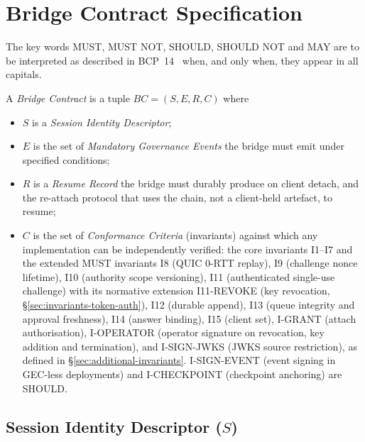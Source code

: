 \section{Bridge Contract Specification}
\label{sec:spec}

The key words MUST, MUST NOT, SHOULD, SHOULD NOT and MAY are to be
interpreted as described in BCP~14~\cite{bradner1997key,leiba2017rfc} when,
and only when, they appear in all capitals.

\begin{definition}\label{def:bc}
A \emph{Bridge Contract} is a tuple $BC = (S, E, R, C)$ where
\begin{itemize}[leftmargin=2em]
\item $S$ is a \emph{Session Identity Descriptor};
\item $E$ is the set of \emph{Mandatory Governance Events} the bridge
must emit under specified conditions;
\item $R$ is a \emph{Resume Record} the bridge must durably produce
on client detach, and the re-attach protocol that uses the chain, not a
client-held artefact, to resume;
\item $C$ is the set of \emph{Conformance Criteria} (invariants) against
which any implementation can be independently verified: the core
invariants I1--I7 and the extended MUST invariants I8 (QUIC 0-RTT replay), I9 (challenge
nonce lifetime), I10 (authority scope versioning), I11 (authenticated
single-use challenge) with its normative extension I11-REVOKE (key
revocation, \S\ref{sec:invariants-token-auth}), I12 (durable append), I13 (queue integrity
and approval freshness), I14 (answer binding), I15 (client set), I-GRANT (attach authorisation), I-OPERATOR (operator
signature on revocation, key addition and termination), and I-SIGN-JWKS
(JWKS source restriction), as
defined in \S\ref{sec:additional-invariants}. I-SIGN-EVENT (event
signing in GEC-less deployments) and I-CHECKPOINT (checkpoint
anchoring) are SHOULD.
\end{itemize}
\end{definition}

\subsection{Session Identity Descriptor ($S$)}

